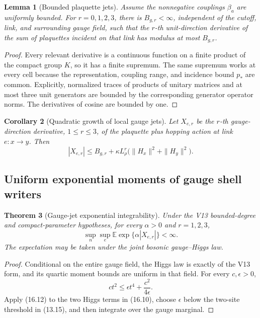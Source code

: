 \documentclass[11pt]{article}
\newtheorem{theorem}{Theorem}[section]
\newtheorem{lemma}[theorem]{Lemma}
\newtheorem{corollary}[theorem]{Corollary}
\theoremstyle{remark}
\begin{document}
\begin{lemma}[Bounded plaquette jets]
\label{lem:v17v16-plaquette}
Assume the nonnegative couplings \(\beta_a\) are uniformly bounded.
For \(r=0,1,2,3\), there is \(B_{g,r}<\infty\), independent of the
cutoff, link, and surrounding gauge field, such that the \(r\)-th
unit-direction derivative of the sum of plaquettes incident on
that link has modulus at most \(B_{g,r}\).
\end{lemma}

\begin{proof}
Every relevant derivative is a continuous function on a finite
product of the compact group \(K\), so it has a finite supremum.
The same supremum works at every cell because the representation,
coupling range, and incidence bound \(p_*\) are common.  Explicitly,
normalized traces of products of unitary matrices and at most
three unit generators are bounded by the corresponding generator
operator norms.  The derivatives of cosine are bounded by one.
\end{proof}

\begin{corollary}[Quadratic growth of local gauge jets]
\label{cor:v17v16-quadratic-jets}
Let \(X_{e,r}\) be the \(r\)-th gauge-direction derivative,
\(1\leq r\leq3\), of the plaquette plus hopping action at link
\(e:x\to y\).  Then
\[
 |X_{e,r}|
 \leq B_{g,r}
 +\kappa L_\rho^r
 \bigl(\|H_x\|^2+\|H_y\|^2\bigr).                  \tag{16.10}
\]
\end{corollary}

\subsection{Uniform exponential moments of gauge shell writers}

\begin{theorem}[Gauge-jet exponential integrability]
\label{thm:v17v16-gauge-jet-moments}
Under the V13 bounded-degree and compact-parameter hypotheses, for
every \(\alpha>0\) and \(r=1,2,3\),
\[
 \sup_n\sup_e
 \mathbb E
 \exp\{\alpha|X_{e,r}|\}<\infty.                   \tag{16.11}
\]
The expectation may be taken under the joint bosonic
gauge--Higgs law.
\end{theorem}

\begin{proof}
Conditional on the entire gauge field, the Higgs law is exactly of
the V13 form, and its quartic moment bounds are uniform in that
field.  For every \(c,\epsilon>0\),
\[
 ct^2\leq\epsilon t^4+\frac{c^2}{4\epsilon}.        \tag{16.12}
\]
Apply (16.12) to the two Higgs terms in (16.10), choose
\(\epsilon\) below the two-site threshold in (13.15), and then
integrate over the gauge marginal.
\end{proof}
\end{document}
